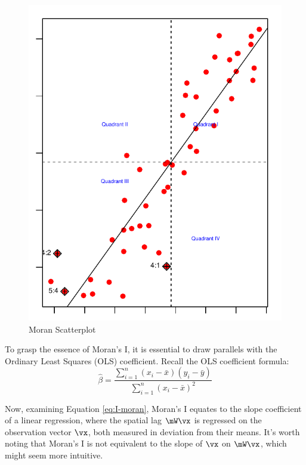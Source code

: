 \documentclass[english,12pt]{book}\usepackage[]{graphicx}\usepackage[]{xcolor}
\makeatletter
\def\maxwidth{ %
  \ifdim\Gin@nat@width>\linewidth
    \linewidth
  \else
    \Gin@nat@width
  \fi
}
\newenvironment{knitrout}{}{} %
\makeatother
\begin{document}
\begin{figure}[ht]
  \caption{Moran Scatterplot}\label{fig:moran_scatterplot}
\begin{knitrout}
\color{fgcolor}

{\centering \includegraphics[width=\maxwidth]{figure/moran-1} 

}


\end{knitrout}
\end{figure}


To grasp the essence of Moran's I, it is essential to draw parallels with the Ordinary Least Squares (OLS) coefficient. Recall the OLS coefficient formula:
\begin{equation*}
  \widehat{\beta}= \frac{\sum_{i = 1}^n\left(x_i - \bar{x}\right)(y_i - \bar{y})}{\sum_{i = 1}^n \left(x_i - \bar{x}\right)^2}
\end{equation*}

Now, examining Equation \eqref{eq:I-moran}, Moran's I equates to the slope coefficient of a linear regression, where the spatial lag $\mW\vx$ is regressed on the observation vector $\vx$, both measured in deviation from their means. It's worth noting that Moran's I is not equivalent to the slope of $\vx$ on $\mW\vx$, which might seem more intuitive.
\end{document}
